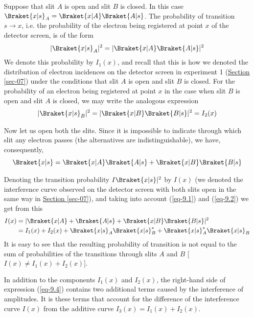 \documentclass[a4paper,sfsidenotes,colorlinks=true]{tufte-book}
\numberwithin{equation}{section}
\numberwithin{figure}{section}
\begin{document}
Suppose that slit $A$ is open and slit $B$ is closed. In this case
$\Braket{x |s}_{A} = \Braket{x|A} \Braket{A|s}$. The probability of
transition $s \to  x$, i.e. the probability of the electron being
registered at point $x$ of the detector screen, is of the form
\begin{equation}%
|\Braket{x|s}_{A}|^{2} = |\Braket{x|A} \Braket{A|s}|^{2}
\label{eq-9.1} 
\end{equation}
We denote this probability by $I_{1} (x)$, and recall that this is how
we denoted the distribution of electron incidences on the detector
screen in experiment 1 (\hyperref[sec-07]{Section \ref{sec-07}}) under
the conditions that slit $A$ is open and slit $B$ is closed. For the
probability of an electron being registered at point $x$ in the case
when slit $B$ is open and slit $A$ is closed, we may write the analogous
expression
\begin{equation}%
|\Braket{x|s}_{B}|^{2} = |\Braket{x|B} \Braket{B|s}|^{2} = I_{2}(x)
\label{eq-9.2} 
\end{equation}

Now let us open both the slits. Since it is impossible to indicate
through which slit any electron passes (the alternatives are
indistinguishable), we have, consequently,
\begin{equation}%
\Braket{x|s} = \Braket{x|A} \Braket{A|s} +  \Braket{x|B} \Braket{B|s}
\label{eq-9.3} 
\end{equation}

Denoting the transition probability $I \Braket{x | s}|^{2}$ by $I (x)$
(we denoted the interference curve observed on the detector screen
with both slits open in the same way in \hyperref[sec-07]{Section
  \ref{sec-07}}), and taking into account (\ref{eq-9.1}) and (\ref{eq-9.2}) we get from
  this
\begin{equation}
\begin{split}
I(x) & = | \Braket{x | A} + \Braket{A|s} + \Braket{x|B} \Braket{B|s} |^2\\
& = I_{1}(x) + I_{2}(x) + \Braket{x|s}_{A} \Braket{x|s}_{B}^{*} + \Braket{x|s}_{A}^{*}\Braket{x|s}_{B} 
\end{split}
\label{eq-9.4}
\end{equation}
It is easy to see that the resulting probability of transition is not
equal to the sum of probabilities of the transitions through slits $A$
and $B$ [$I (x) \ne  I_{1}(x) + I_{2}(x)$].

In addition to the components $I_{1}(x)$ and $I_{2}(x)$, the right-hand side
of expression (\ref{eq-9.4}) contains two additional terms caused by
the interference	of amplitudes. It is these terms that account
for the difference of the interference curve $I(x)$ from the additive
curve  $I_{3}(x) = I_{1}(x) + I_{2}(x)$.
\end{document}
